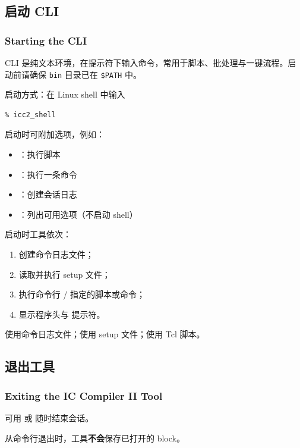 \subsection{启动 CLI}
\subsubsection*{Starting the CLI}

CLI 是纯文本环境，在提示符下输入命令，常用于脚本、批处理与一键流程。启动前请确保 \texttt{bin} 目录已在 \texttt{\$PATH} 中。

启动方式：在 Linux shell 中输入
\begin{lstlisting}
% icc2_shell
\end{lstlisting}

启动时可附加选项，例如：
\begin{itemize}
  \item {}：执行脚本
  \item {}：执行一条命令
  \item {}：创建会话日志
  \item {}：列出可用选项（不启动 shell）
\end{itemize}

启动时工具依次：
\begin{enumerate}
  \item 创建命令日志文件；
  \item 读取并执行 setup 文件；
  \item 执行命令行 / 指定的脚本或命令；
  \item 显示程序头与  提示符。
\end{enumerate}

\begin{seeAlsoBox}
使用命令日志文件；使用 setup 文件；使用 Tcl 脚本。
\end{seeAlsoBox}

\subsection{退出工具}
\subsubsection*{Exiting the IC Compiler II Tool}

可用  或  随时结束会话。

\begin{noteBox}
从命令行退出时，工具\textbf{不会}保存已打开的 block。
\end{noteBox}

